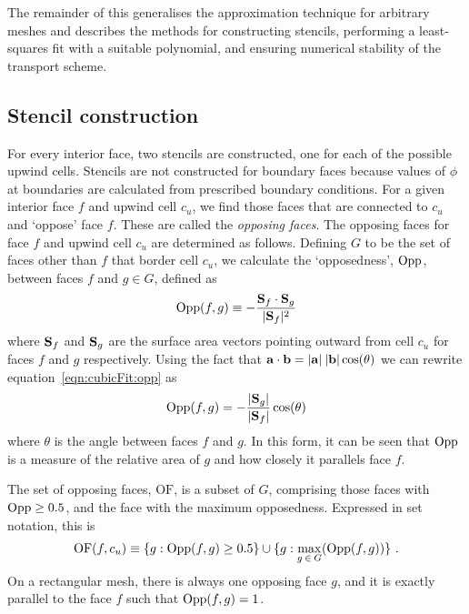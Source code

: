 The remainder of this  generalises the approximation technique for arbitrary meshes and describes the methods for constructing stencils, performing a least-squares fit with a suitable polynomial, and ensuring numerical stability of the transport scheme.

\subsection{Stencil construction}
\label{sec:cubicFit:stencil}

For every interior face, two stencils are constructed, one for each of the possible upwind cells.
Stencils are not constructed for boundary faces because values of $\phi$ at boundaries are calculated from prescribed boundary conditions.
For a given interior face $f$ and upwind cell $c_u$, we find those faces that are connected to $c_u$ and `oppose' face $f$.  These are called the \textit{opposing faces}.
The opposing faces for face $f$ and upwind cell $c_u$ are determined as follows.
Defining $G$ to be the set of faces other than $f$ that border cell $c_u$, we calculate the `opposedness', $\mathrm{Opp}$, between faces $f$ and $g \in G$, defined as
\begin{align}
	\mathrm{Opp}(f, g) \equiv - \frac{\mathbf{S}_f \cdot \mathbf{S}_g}{\lvert \mathbf{S}_f \rvert^2} \label{eqn:cubicFit:opp}
\end{align}
where $\mathbf{S}_f$ and $\mathbf{S}_g$ are the surface area vectors pointing outward from cell $c_u$ for faces $f$ and $g$ respectively.
Using the fact that $\mathbf{a} \cdot \mathbf{b} = \lvert \mathbf{a} \rvert\:\lvert \mathbf{b} \rvert \cos(\theta)$ we can rewrite equation~\eqref{eqn:cubicFit:opp} as
\begin{align}
	\mathrm{Opp}(f, g) = - \frac{\lvert \mathbf{S}_g \rvert}{\lvert \mathbf{S}_f \rvert} \cos(\theta)
\end{align}
where $\theta$ is the angle between faces $f$ and $g$.  In this form, it can be seen that $\mathrm{Opp}$ is a measure of the relative area of $g$ and how closely it parallels face $f$.

The set of opposing faces, $\mathrm{OF}$, is a subset of $G$, comprising those faces with $\mathrm{Opp} \geq 0.5$, and the face with the maximum opposedness.  Expressed in set notation, this is
\begin{align}
	\mathrm{OF}(f,c_u) \equiv \{ g : \mathrm{Opp}(f, g) \geq 0.5 \} \cup \{ g : \max_{g\:\in\:G}(\mathrm{Opp}(f, g)) \} \text{ .}
\end{align}
On a rectangular mesh, there is always one opposing face $g$, and it is exactly parallel to the face $f$ such that $\mathrm{Opp}(f, g) = 1$.

